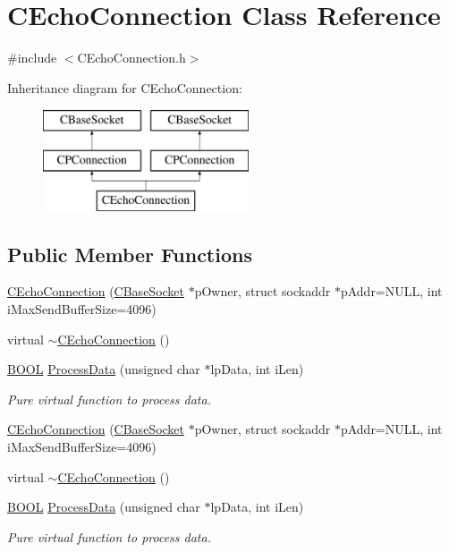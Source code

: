 \hypertarget{class_c_echo_connection}{\section{\-C\-Echo\-Connection \-Class \-Reference}
\label{class_c_echo_connection}
}


{\ttfamily \#include $<$\-C\-Echo\-Connection.\-h$>$}

\-Inheritance diagram for \-C\-Echo\-Connection\-:\begin{figure}[H]
\begin{center}
\leavevmode
\includegraphics[height=3.000000cm]{class_c_echo_connection}
\end{center}
\end{figure}
\subsection*{\-Public \-Member \-Functions}
\begin{DoxyCompactItemize}
\item 
\hyperlink{class_c_echo_connection_a9ca0702071261601e37336232e08e531}{\-C\-Echo\-Connection} (\hyperlink{class_c_base_socket}{\-C\-Base\-Socket} $\ast$p\-Owner, struct sockaddr $\ast$p\-Addr=\-N\-U\-L\-L, int i\-Max\-Send\-Buffer\-Size=4096)
\item 
virtual \hyperlink{class_c_echo_connection_a61681b3f199d03d5e047b48f58310db1}{$\sim$\-C\-Echo\-Connection} ()
\item 
\hyperlink{_cpclient_8h_a3be13892ae7076009afcf121347dd319}{\-B\-O\-O\-L} \hyperlink{class_c_echo_connection_ac10d197eb5e2d1667dc044037f2151c5}{\-Process\-Data} (unsigned char $\ast$lp\-Data, int i\-Len)
\begin{DoxyCompactList}\small\item\em \-Pure virtual function to process data. \end{DoxyCompactList}\item 
\hyperlink{class_c_echo_connection_a9ca0702071261601e37336232e08e531}{\-C\-Echo\-Connection} (\hyperlink{class_c_base_socket}{\-C\-Base\-Socket} $\ast$p\-Owner, struct sockaddr $\ast$p\-Addr=\-N\-U\-L\-L, int i\-Max\-Send\-Buffer\-Size=4096)
\item 
virtual \hyperlink{class_c_echo_connection_a6a44ac933ebb5d0247fdc140306a2731}{$\sim$\-C\-Echo\-Connection} ()
\item 
\hyperlink{_cpclient_8h_a3be13892ae7076009afcf121347dd319}{\-B\-O\-O\-L} \hyperlink{class_c_echo_connection_ac10d197eb5e2d1667dc044037f2151c5}{\-Process\-Data} (unsigned char $\ast$lp\-Data, int i\-Len)
\begin{DoxyCompactList}\small\item\em \-Pure virtual function to process data. \end{DoxyCompactList}\end{DoxyCompactItemize}


